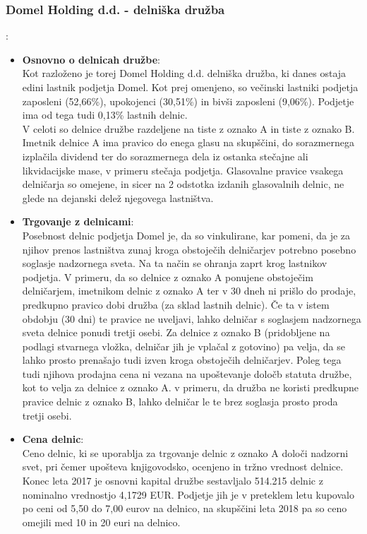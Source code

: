 \documentclass[12pt,a4paper]{amsart}
\theoremstyle{definition} %
\theoremstyle{plain} %
\begin{document}
\subsubsection{Domel Holding d.d. - delniška družba}:\\

\begin{itemize}
\item \textbf{Osnovno o delnicah družbe}:\\
Kot razloženo je torej Domel Holding d.d. delniška družba, ki danes ostaja edini lastnik podjetja Domel. Kot prej omenjeno, so večinski lastniki podjetja zaposleni (52,66\%), upokojenci (30,51\%) in bivši zaposleni (9,06\%). Podjetje ima od tega tudi 0,13\% lastnih delnic.\\
V celoti so delnice družbe razdeljene na tiste z oznako A in tiste z oznako B. Imetnik delnice A ima pravico do enega glasu na skupščini, do sorazmernega izplačila dividend ter do sorazmernega dela iz ostanka stečajne ali likvidacijske mase, v primeru stečaja podjetja. Glasovalne pravice vsakega delničarja so omejene, in sicer na 2 odstotka izdanih glasovalnih delnic, ne glede na dejanski delež njegovega lastništva.\\
\item \textbf{Trgovanje z delnicami}:\\
Posebnost delnic podjetja Domel je, da so vinkulirane, kar pomeni, da je za njihov prenos lastništva zunaj kroga obstoječih delničarjev potrebno posebno soglasje nadzornega sveta. Na ta način se ohranja zaprt krog lastnikov podjetja. V primeru, da so delnice z oznako A ponujene obstoječim delničarjem, imetnikom delnic z oznako A ter v 30 dneh ni prišlo do prodaje, predkupno pravico dobi družba (za sklad lastnih delnic). Če ta v istem obdobju (30 dni) te pravice ne uveljavi, lahko delničar s soglasjem nadzornega sveta delnice ponudi tretji osebi.
Za delnice z oznako B (pridobljene na podlagi stvarnega vložka, delničar jih je vplačal z gotovino) pa velja, da se lahko prosto prenašajo tudi izven kroga obstoječih delničarjev. Poleg tega tudi njihova prodajna cena ni vezana na upoštevanje določb statuta družbe, kot to velja za delnice z oznako A. v primeru, da družba ne koristi predkupne pravice delnic z oznako B, lahko delničar le te brez soglasja prosto proda tretji osebi.\\
\item \textbf{Cena delnic}:\\
Ceno delnic, ki se uporablja za trgovanje delnic z oznako A določi nadzorni svet, pri čemer upošteva knjigovodsko, ocenjeno in tržno vrednost delnice. Konec leta 2017 je osnovni kapital družbe sestavljalo 514.215 delnic z nominalno vrednostjo 4,1729 EUR. Podjetje jih je v preteklem letu kupovalo po ceni od 5,50 do 7,00 eurov na delnico, na skupščini leta 2018 pa so ceno omejili med 10 in 20 euri na delnico.
\end{itemize}
\end{document}
